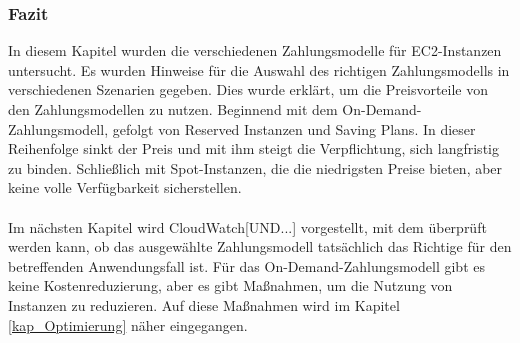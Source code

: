 
\subsubsection*{Fazit}
In diesem Kapitel wurden die verschiedenen Zahlungsmodelle für EC2-Instanzen untersucht. Es wurden Hinweise für die Auswahl des richtigen Zahlungsmodells in verschiedenen Szenarien gegeben. Dies wurde erklärt, um die Preisvorteile von den Zahlungsmodellen zu nutzen. Beginnend mit dem On-Demand-Zahlungsmodell, gefolgt von Reserved Instanzen und Saving Plans. In dieser Reihenfolge sinkt der Preis und mit ihm steigt die Verpflichtung, sich langfristig zu binden. Schließlich mit Spot-Instanzen, die die niedrigsten Preise bieten, aber keine volle Verfügbarkeit sicherstellen.%
\\\\
Im nächsten Kapitel wird CloudWatch[UND...] vorgestellt, mit dem überprüft werden kann, ob das ausgewählte Zahlungsmodell tatsächlich das Richtige für den betreffenden Anwendungsfall ist. Für das On-Demand-Zahlungsmodell gibt es keine Kostenreduzierung, aber es gibt Maßnahmen, um die Nutzung von Instanzen zu reduzieren. Auf diese Maßnahmen wird im Kapitel \ref{kap_Optimierung} näher eingegangen.